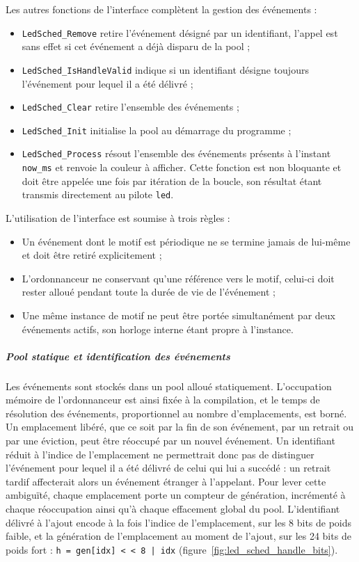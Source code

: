 Les autres fonctions de l'interface complètent la gestion des événements :
\begin{itemize}
	\item \texttt{LedSched\_Remove} retire l'événement désigné par un identifiant, l'appel est sans effet si cet événement a
	déjà disparu de la pool ;
	\item \texttt{LedSched\_IsHandleValid} indique si un identifiant désigne toujours l'événement pour lequel il a été délivré ;
	\item \texttt{LedSched\_Clear} retire l'ensemble des événements ;
	\item \texttt{LedSched\_Init} initialise la pool au démarrage du programme ;
	\item \texttt{LedSched\_Process} résout l'ensemble des événements présents à l'instant \texttt{now\_ms} et renvoie la
	couleur à afficher. Cette fonction est non bloquante et doit être appelée une fois par itération de la boucle, son
	résultat étant transmis directement au pilote \texttt{led}.\\
\end{itemize}

L'utilisation de l'interface est soumise à trois règles :
\begin{itemize}
	\item Un événement dont le motif est périodique ne se termine jamais de lui-même et doit être retiré explicitement ;
	\item L'ordonnanceur ne conservant qu'une référence vers le motif, celui-ci doit rester alloué pendant toute la durée de
	vie de l'événement ; 
	\item Une même instance de motif ne peut être portée simultanément par deux événements actifs, son horloge interne étant
	propre à l'instance.
\end{itemize}

\subparagraph*{Pool statique et identification des événements} Les événements sont stockés dans un pool alloué statiquement.
L'occupation mémoire de l'ordonnanceur est ainsi fixée à la compilation, et le temps de résolution des événements,
proportionnel au nombre d'emplacements, est borné. Un emplacement libéré, que ce soit par la fin de son événement, par un
retrait ou par une éviction, peut être réoccupé par un nouvel événement. Un identifiant réduit à l'indice de l'emplacement ne
permettrait donc pas de distinguer l'événement pour lequel il a été délivré de celui qui lui a succédé : un retrait tardif
affecterait alors un événement étranger à l'appelant. Pour lever cette ambiguïté, chaque emplacement porte un compteur de
génération, incrémenté à chaque réoccupation ainsi qu'à chaque effacement global du pool. L'identifiant délivré à l'ajout
encode à la fois l'indice de l'emplacement, sur les 8 bits de poids faible, et la génération de l'emplacement au moment de
l'ajout, sur les 24 bits de poids fort : \texttt{h = gen[idx] < < 8 | idx} (figure~\ref{fig:led_sched_handle_bits}).

